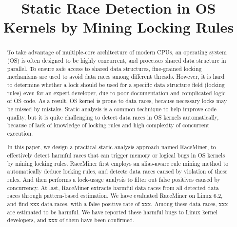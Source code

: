 \documentclass[pageno]{jpaper}
\begin{document}
\title{
Static Race Detection in OS Kernels by Mining Locking Rules}

\date{}
\maketitle

\thispagestyle{empty}

\begin{abstract}
	
To take advantage of multiple-core architecture of modern CPUs, an operating 
system (OS) is often designed to be highly concurrent, and processes shared 
data structure in parallel. To ensure safe access to shared data structures, 
fine-grained locking mechanisms are used to avoid data races among different 
threads. However, it is hard to determine whether a lock should be used for a 
specific data structure field (locking rules) even for an expert developer, due 
to poor documentation and complicated logic of OS code. As a result, OS kernel 
is prone to data races, because necessary locks may be missed by mistake. 
Static analysis is a common technique to help improve code quality, but it is 
quite challenging to detect data races in OS kernels automatically, because of 
lack of knowledge of locking rules and high complexity of concurrent execution.

In this paper, we design a practical static analysis approach named RaceMiner, 
to effectively detect harmful races that can trigger memory or logical bugs in 
OS kernels by mining locking rules. RaceMiner first employs an alias-aware rule 
mining method to automatically deduce locking rules, and detects data races 
caused by violation of these rules. And then performs a lock-usage analysis to 
filter out false positives caused by concurrency. At last, RaceMiner extracts 
harmful data races from all detected data races through pattern-based 
estimation. We have evaluated RaceMiner on Linux 6.2, and find xxx data races, 
with a false positive rate of xxx. Among these data races, xxx are estimated to 
be harmful. We have reported these harmful bugs to Linux kernel developers, and 
xxx of them have been confirmed.

\end{abstract}





\end{document}
